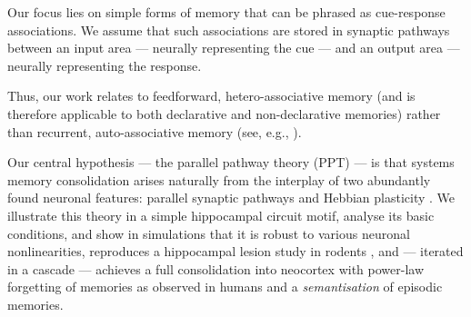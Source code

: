 Our focus lies on simple forms of memory that can be phrased as cue-response associations. We assume that such associations are stored in synaptic pathways between an input area --- neurally representing the cue --- and an output area --- neurally representing the response.

Thus, our work relates to feedforward, hetero-associative memory (and is therefore applicable to both declarative and non-declarative memories) rather than recurrent, auto-associative memory (see, e.g., \cite{Hopfield1982, Zenke2015, Tome2020}).

Our central hypothesis --- the parallel pathway theory (PPT) --- is that systems memory consolidation arises naturally from the interplay of two abundantly found neuronal features: parallel synaptic pathways and Hebbian plasticity \cite{VanEssen1992, Malenka2004}.
We illustrate this theory in a simple hippocampal circuit motif, analyse its basic conditions, and show in simulations that it is robust to various neuronal nonlinearities, reproduces a hippocampal lesion study in rodents \cite{Remondes2004}, and --- iterated in a cascade --- achieves a full consolidation into neocortex with power-law forgetting of memories as observed in humans \cite{Wixted2004} and a \emph{semantisation} of episodic memories.
